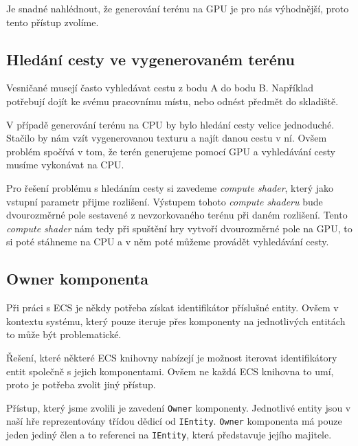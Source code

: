 Je snadné nahlédnout, že generování terénu na GPU je pro nás výhodnější, proto tento přístup zvolíme.

\subsection{Hledání cesty ve vygenerovaném terénu}
\label{subsection:path-finding}
Vesničané musejí často vyhledávat cestu z bodu A do bodu B. Například potřebují dojít ke svému pracovnímu místu, nebo odnést předmět do skladiště.

V případě generování terénu na CPU by bylo hledání cesty velice jednoduché. Stačilo by nám vzít vygenerovanou texturu a najít danou cestu v ní. Ovšem problém spočívá v tom, že terén generujeme pomocí GPU a vyhledávání cesty musíme vykonávat na CPU.

Pro řešení problému s hledáním cesty si zavedeme \textit{compute shader}, který jako vstupní parametr přijme rozlišení. Výstupem tohoto \textit{compute shaderu} bude dvourozměrné pole sestavené z nevzorkovaného terénu při daném rozlišení. Tento \textit{compute shader} nám tedy při spuštění hry vytvoří dvourozměrné pole na GPU, to si poté stáhneme na CPU a v něm poté můžeme provádět vyhledávání cesty.




\subsection{Owner komponenta}
Při práci s ECS je někdy potřeba získat identifikátor příslušné entity. Ovšem v kontextu systému, který pouze iteruje přes komponenty na jednotlivých entitách to může být problematické.

Řešení, které některé ECS knihovny nabízejí je možnost iterovat identifikátory entit společně s jejich komponentami. Ovšem ne každá ECS knihovna to umí, proto je potřeba zvolit jiný přístup.

Přístup, který jsme zvolili je zavedení \texttt{Owner} komponenty. Jednotlivé entity jsou v naší hře reprezentovány třídou dědicí od \texttt{IEntity}. \texttt{Owner} komponenta má pouze jeden jediný člen a to referenci na \texttt{IEntity}, která představuje jejího majitele.









